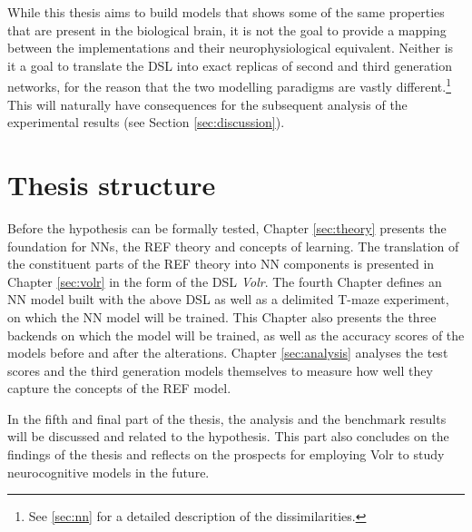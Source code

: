 \documentclass[report.tex]{subfiles}
\begin{document}
While this thesis aims to build models that shows some of the same
properties that are present in the biological brain,  
it is not the goal to provide a mapping between the
implementations and their neurophysiological equivalent.
Neither is it a goal to translate the \gls{DSL} into exact replicas
of second and third generation networks, for the reason that the
two modelling paradigms are vastly different.\footnote{See \ref{sec:nn}
for a detailed description of the dissimilarities.}
This will naturally have consequences for the subsequent analysis of the
experimental results (see Section \ref{sec:discussion}).

\section{Thesis structure}
Before the hypothesis can be formally tested, Chapter \ref{sec:theory}
presents the foundation for \gls{NN}s, the \gls{REF} theory and
concepts of learning.
The translation of the constituent parts of the \gls{REF} theory
into \gls{NN} components is presented in Chapter \ref{sec:volr} in 
the form of the \gls{DSL} \textit{Volr}. 
The fourth Chapter defines an \gls{NN} model built with the above
\gls{DSL} as well as a delimited T-maze experiment, on which the 
\gls{NN} model will be trained.
This Chapter also presents the three \gls{backend}s on which the 
model will be trained, as well as the accuracy scores of the models
before and after the alterations.
Chapter \ref{sec:analysis} analyses the test scores and the third 
generation models themselves to measure how well they capture the
concepts of the \gls{REF} model.

In the fifth and final part of the thesis, the analysis and the benchmark
results will be discussed and related to the hypothesis.
This part also concludes on the findings of the thesis and
reflects on the prospects for employing Volr to study neurocognitive
models in the future.

\end{document}
